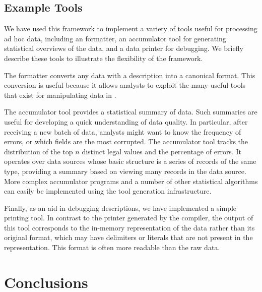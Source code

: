 \documentclass{sigplanconf}
\begin{document}
\subsection{Example Tools}
\label{sec:gentool-motivation-ex}

We have used this framework to implement a variety of tools useful for processing ad hoc data, including an \xml{} formatter, an accumulator tool for generating statistical overviews of the data, and a data printer for debugging.  We briefly describe these tools to illustrate the flexibility of the framework.

The \xml{} formatter converts any data with a \padsml{} description
into a canonical \xml{} format.  This conversion is useful because it
allows analysts to exploit the many useful tools that exist for
manipulating data in \xml{}. 

The accumulator tool provides a statistical summary of data.
Such summaries are useful for developing a quick understanding of data quality.  In particular, after receiving a new batch of data, analysts might want to know the frequency of errors, or which fields are the most corrupted. 
The accumulator tool tracks the distribution of the top $n$
distinct legal values and the percentage of errors. 
It operates over data sources
whose basic structure is a series of records of the same type, 
providing a summary based on viewing many records
in the data source.    More complex accumulator programs and a number of other statistical algorithms can easily be implemented using the tool generation infrastructure.

Finally, as an aid in debugging \padsml{} descriptions, we have implemented a simple printing tool.  In contrast to the printer generated by the \padsml{} compiler, the output of this tool corresponds to the in-memory
representation of the data rather than its original format, which may have delimiters or literals that are not present in the representation.  
This format is often more readable than the raw data.



\section{Conclusions}
\label{sec:future}
\end{document}
